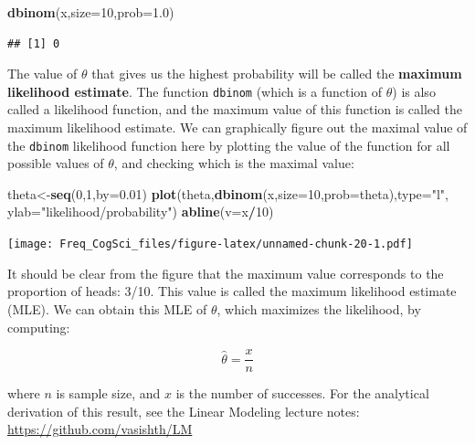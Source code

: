 \documentclass[12pt,]{krantz}
\newenvironment{Shaded}{\begin{snugshade}}{\end{snugshade}}
\newcommand{\DataTypeTok}[1]{\textcolor[rgb]{0.13,0.29,0.53}{#1}}
\newcommand{\DecValTok}[1]{\textcolor[rgb]{0.00,0.00,0.81}{#1}}
\newcommand{\FloatTok}[1]{\textcolor[rgb]{0.00,0.00,0.81}{#1}}
\newcommand{\KeywordTok}[1]{\textcolor[rgb]{0.13,0.29,0.53}{\textbf{#1}}}
\newcommand{\NormalTok}[1]{#1}
\newcommand{\OperatorTok}[1]{\textcolor[rgb]{0.81,0.36,0.00}{\textbf{#1}}}
\newcommand{\StringTok}[1]{\textcolor[rgb]{0.31,0.60,0.02}{#1}}
\begin{document}
\begin{Shaded}
\begin{Highlighting}[]
\KeywordTok{dbinom}\NormalTok{(x,}\DataTypeTok{size=}\DecValTok{10}\NormalTok{,}\DataTypeTok{prob=}\FloatTok{1.0}\NormalTok{)}
\end{Highlighting}
\end{Shaded}

\begin{verbatim}
## [1] 0
\end{verbatim}

The value of \(\theta\) that gives us the highest probability will be called the \textbf{maximum likelihood estimate}. The function \texttt{dbinom} (which is a function of \(\theta\)) is also called a likelihood function, and the maximum value of this function is called the maximum likelihood estimate. We can graphically figure out the maximal value of the \texttt{dbinom} likelihood function here by plotting the value of the function for all possible values of \(\theta\), and checking which is the maximal value:

\begin{Shaded}
\begin{Highlighting}[]
\NormalTok{theta<-}\KeywordTok{seq}\NormalTok{(}\DecValTok{0}\NormalTok{,}\DecValTok{1}\NormalTok{,}\DataTypeTok{by=}\FloatTok{0.01}\NormalTok{)}
\KeywordTok{plot}\NormalTok{(theta,}\KeywordTok{dbinom}\NormalTok{(x,}\DataTypeTok{size=}\DecValTok{10}\NormalTok{,}\DataTypeTok{prob=}\NormalTok{theta),}\DataTypeTok{type=}\StringTok{"l"}\NormalTok{,}
     \DataTypeTok{ylab=}\StringTok{"likelihood/probability"}\NormalTok{)}
\KeywordTok{abline}\NormalTok{(}\DataTypeTok{v=}\NormalTok{x}\OperatorTok{/}\DecValTok{10}\NormalTok{)}
\end{Highlighting}
\end{Shaded}

\texttt{[image: Freq\_CogSci\_files/figure-latex/unnamed-chunk-20-1.pdf]}

It should be clear from the figure that the maximum value corresponds to the proportion of heads: 3/10. This value is called the maximum likelihood estimate (MLE). We can obtain this MLE of \(\theta\), which maximizes the likelihood, by computing:

\begin{equation}
\hat \theta = \frac{x}{n}
\end{equation}

where \(n\) is sample size, and \(x\) is the number of successes. For the analytical derivation of this result, see the Linear Modeling lecture notes:
\url{https://github.com/vasishth/LM}
\end{document}
